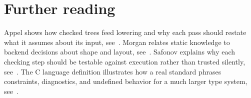 \section{Further reading}
\label{sec:ch39-reading}

Appel shows how checked trees feed lowering and why each pass should restate what it assumes about its input, see~\cite{appel-1998-modern}.
Morgan relates static knowledge to backend decisions about shape and layout, see~\cite{morgan-1998-optimizing}.
Safonov explains why each checking step should be testable against execution rather than trusted silently, see~\cite{safonov-2010-trustworthy}.
The C language definition illustrates how a real standard phrases constraints, diagnostics, and undefined behavior for a much larger type system, see~\cite{wg14-2011-c11}.
